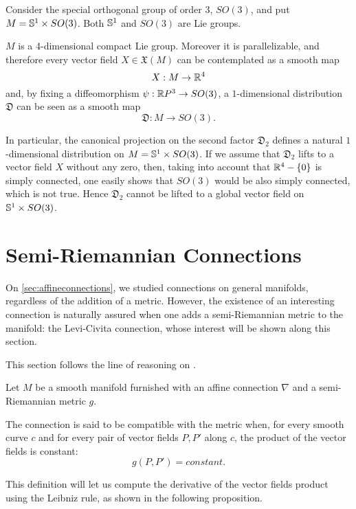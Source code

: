 \begin{example}
	\label{ex:nonvanishing}
	Consider the special orthogonal group of order 3, $SO(3)$, and put $M=\S^{1}\times SO(3)$. Both $\S^1$ and $SO(3)$ are Lie groups.
	
	$M$ is a 4-dimensional compact Lie group. Moreover it is parallelizable, and therefore every vector field $X\in\mathfrak{X}(M)$ can be contemplated as a smooth map $$X:M\rightarrow \R^{4}$$ and, by fixing a diffeomorphism $\psi:\R P^{3}\rightarrow SO(3)$, a $1$-dimensional distribution $\mathfrak{D}$ can be seen as a smooth map $$\mathfrak{D}:M\rightarrow SO(3).$$
	
	In particular, the canonical projection on the second factor $\mathfrak{D}_2$ defines a natural $1$-dimensional distribution on $M=\S^{1}\times SO(3)$. If we assume that $\mathfrak{D}_2$ lifts to a vector field $X$ without any zero, then, taking into account that $\R^{4}-\{0\}$ is simply connected, one easily shows that $SO(3)$ would be also simply connected, which is not true. Hence $\mathfrak{D}_2$ cannot be lifted to a global vector field on $\S^{1}\times SO(3)$.
\end{example}

\section{Semi-Riemannian Connections}

On \autoref{sec:affineconnections}, we studied connections on general manifolds, regardless of the addition of a metric. However, the existence of an interesting connection is naturally assured when one adds a semi-Riemannian metric to the manifold: the Levi-Civita connection, whose interest will be shown along this section.

This section follows the line of reasoning on \cite[Ch. 2, Section 3]{docarmo79}.

\begin{definition}
	Let $M$ be a smooth manifold furnished with an affine connection $\nabla$ and a semi-Riemannian metric $g$.
	
	The connection is said to be compatible with the metric when, for every smooth curve $c$ and for every pair of vector fields $P, P'$ along $c$, the product of the vector fields is constant:
	\[
		g(P, P') = constant.
	\]
\end{definition}

This definition will let us compute the derivative of the vector fields product using the Leibniz rule, as shown in the following proposition.

